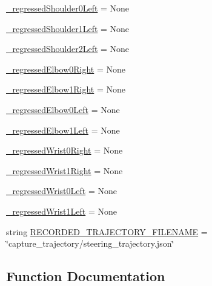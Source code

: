 \begin{DoxyCompactItemize}
\item 
\mbox{\hyperlink{namespacesteering__response__test_a67229c89ccb5341c314b47db47d4ff3f}{\+\_\+regressed\+Shoulder0\+Left}} = None
\item 
\mbox{\hyperlink{namespacesteering__response__test_a15a20a7aaebedf86d2cb83eda5a86a04}{\+\_\+regressed\+Shoulder1\+Left}} = None
\item 
\mbox{\hyperlink{namespacesteering__response__test_aa70563b71be4a2e5cffed86cc3d0864d}{\+\_\+regressed\+Shoulder2\+Left}} = None
\item 
\mbox{\hyperlink{namespacesteering__response__test_af4b525f3c1d4f9442cc00de2b02c4aa2}{\+\_\+regressed\+Elbow0\+Right}} = None
\item 
\mbox{\hyperlink{namespacesteering__response__test_ad6e0ef14c23f4f4bcb1832852e749a61}{\+\_\+regressed\+Elbow1\+Right}} = None
\item 
\mbox{\hyperlink{namespacesteering__response__test_ac1e4f2b4131a586b0f891a7797fe3169}{\+\_\+regressed\+Elbow0\+Left}} = None
\item 
\mbox{\hyperlink{namespacesteering__response__test_ad4e5ed252f95d11c74de49f7caa8bec3}{\+\_\+regressed\+Elbow1\+Left}} = None
\item 
\mbox{\hyperlink{namespacesteering__response__test_ad5a670b54c809068f34eb2911dc16d38}{\+\_\+regressed\+Wrist0\+Right}} = None
\item 
\mbox{\hyperlink{namespacesteering__response__test_a278ebfe9c79fa5c1614093fa8af57557}{\+\_\+regressed\+Wrist1\+Right}} = None
\item 
\mbox{\hyperlink{namespacesteering__response__test_a18e1d19c053197e386d93d81331e170e}{\+\_\+regressed\+Wrist0\+Left}} = None
\item 
\mbox{\hyperlink{namespacesteering__response__test_a87f18a047fe885143ac4f268fcad2761}{\+\_\+regressed\+Wrist1\+Left}} = None
\item 
string \mbox{\hyperlink{namespacesteering__response__test_ac1e5ed01b23c74cc2d11ed9da9bde88b}{R\+E\+C\+O\+R\+D\+E\+D\+\_\+\+T\+R\+A\+J\+E\+C\+T\+O\+R\+Y\+\_\+\+F\+I\+L\+E\+N\+A\+ME}} = \char`\"{}capture\+\_\+trajectory/steering\+\_\+trajectory.\+json\char`\"{}
\end{DoxyCompactItemize}


\subsection{Function Documentation}
\mbox{\label{namespacesteering__response__test_af859bb1c210c019053b42c2e9c7d713d}} 
